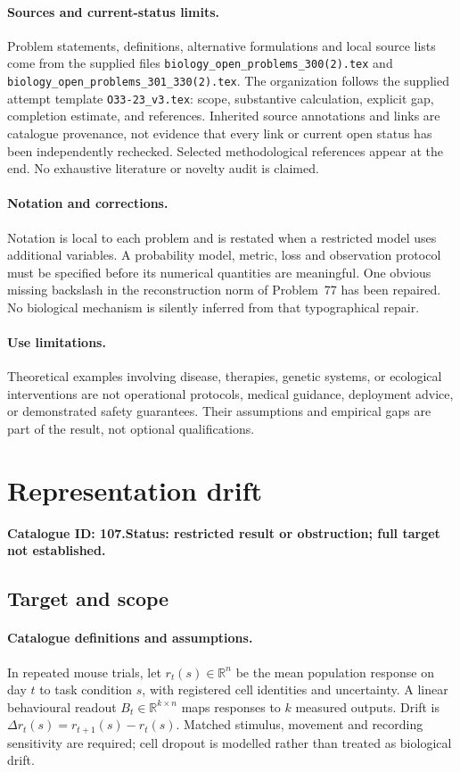 \documentclass[11pt]{article}
\newcommand{\R}{\mathbb R}
\providecommand{\R}{\mathbb R}
\begin{document}
\paragraph{Sources and current-status limits.}
Problem statements, definitions, alternative formulations and local source lists
come from the supplied files
\texttt{biology\_open\_problems\_300(2).tex} and
\texttt{biology\_open\_problems\_301\_330(2).tex}.
The organization follows the supplied attempt template
\texttt{O33-23\_v3.tex}: scope, substantive calculation, explicit gap,
completion estimate, and references. Inherited source annotations and links are
catalogue provenance, not evidence that every link or current open status has
been independently rechecked. Selected methodological references appear at the
end. No exhaustive literature or novelty audit is claimed.

\paragraph{Notation and corrections.}
Notation is local to each problem and is restated when a restricted model uses
additional variables. A probability model, metric, loss and observation protocol
must be specified before its numerical quantities are meaningful. One obvious
missing backslash in the reconstruction norm of Problem~77 has been repaired.
No biological mechanism is silently inferred from that typographical repair.

\paragraph{Use limitations.}
Theoretical examples involving disease, therapies, genetic systems, or ecological
interventions are not operational protocols, medical guidance, deployment advice,
or demonstrated safety guarantees. Their assumptions and empirical gaps are part
of the result, not optional qualifications.

\setcounter{section}{106}
\section{Representation drift}
\label{prob:107}
\noindent\textbf{Catalogue ID: 107.}\quad \textbf{Status: restricted result or obstruction; full target not established.}
\subsection{Target and scope}
\paragraph{Catalogue definitions and assumptions.}
In repeated mouse trials, let $r_t(s)\in\R^n$ be the mean population response on day $t$ to task condition $s$, with registered cell identities and uncertainty. A linear behavioural readout $B_t\in\R^{k\times n}$ maps responses to $k$ measured outputs. Drift is $\Delta r_t(s)=r_{t+1}(s)-r_t(s)$. Matched stimulus, movement and recording sensitivity are required; cell dropout is modelled rather than treated as biological drift.
\end{document}
